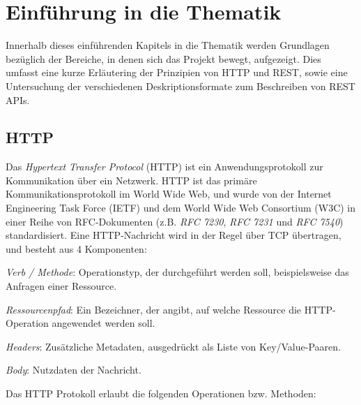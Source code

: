 
\section{Einführung in die Thematik}

Innerhalb dieses einführenden Kapitels in die Thematik werden Grundlagen bezüglich der Bereiche, in denen sich das Projekt bewegt, aufgezeigt. Dies umfasst eine kurze Erläutering der Prinzipien von HTTP und REST, sowie eine Untersuchung der verschiedenen Deskriptionsformate zum Beschreiben von REST APIs.

\subsection{HTTP}

Das \emph{Hypertext Transfer Protocol} (HTTP) ist ein Anwendungsprotokoll zur Kommunikation über ein Netzwerk. HTTP ist das primäre Kommunikationsprotokoll im World Wide Web, und wurde von der Internet Engineering Task Force (IETF) und dem World Wide Web Consortium (W3C) in einer Reihe von RFC-Dokumenten (z.B. \emph{RFC 7230}, \emph{RFC 7231} und \emph{RFC 7540}) standardisiert. Eine HTTP-Nachricht wird in der Regel über TCP übertragen, und besteht aus 4 Komponenten:

\begin{description}
	\item \emph{Verb / Methode}: Operationstyp, der durchgeführt werden soll, beispielsweise das Anfragen einer Ressource.
    \item \emph{Ressourcenpfad}: Ein Bezeichner, der angibt, auf welche Ressource die HTTP-Operation angewendet werden soll.
    \item \emph{Headers}: Zusätzliche Metadaten, ausgedrückt als Liste von Key/Value-Paaren.
    \item \emph{Body}: Nutzdaten der Nachricht.
\end{description}

Das HTTP Protokoll erlaubt die folgenden Operationen bzw. Methoden:

